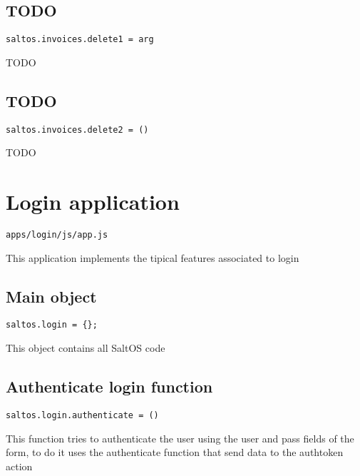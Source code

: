 \documentclass[a4paper]{book}
\begin{document}
\subsection{TODO}

\begin{lstlisting}
saltos.invoices.delete1 = arg
\end{lstlisting}

TODO

\hypertarget{toc88}{}
\subsection{TODO}

\begin{lstlisting}
saltos.invoices.delete2 = ()
\end{lstlisting}

TODO

\hypertarget{toc89}{}
\section{Login application}

\begin{lstlisting}
apps/login/js/app.js
\end{lstlisting}

This application implements the tipical features associated to login

\hypertarget{toc90}{}
\subsection{Main object}

\begin{lstlisting}
saltos.login = {};
\end{lstlisting}

This object contains all SaltOS code

\hypertarget{toc91}{}
\subsection{Authenticate login function}

\begin{lstlisting}
saltos.login.authenticate = ()
\end{lstlisting}

This function tries to authenticate the user using the user and pass fields of the form, to do
it uses the authenticate function that send data to the authtoken action
\end{document}
